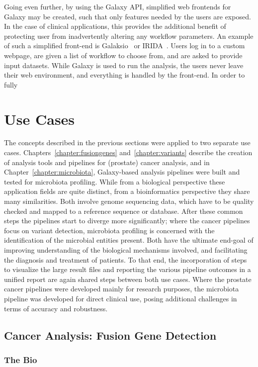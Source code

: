 Going even further, by using the Galaxy API, simplified web frontends for Galaxy may be created, such that only features needed by the users are exposed. In the case of clinical applications, this provides the additional benefit of protecting user from inadvertently altering any workflow parameters. An example of such a simplified front-end is Galaksio~\cite{galaksio} or IRIDA~\cite{matthews2018integrated}. Users log in to a custom webpage, are given a list of workflow to choose from, and are asked to provide input datasets. While Galaxy is used to run the analysis, the users never leave their web environment, and everything is handled by the front-end. In order to fully


\section{Use Cases}

The concepts described in the previous sections were applied to two separate use cases. Chapters~\ref{chapter:fusiongenes} and~\ref{chapter:variants} describe the creation of analysis tools and pipelines for (prostate) cancer analysis, and in Chapter~\ref{chapter:microbiota}, Galaxy-based analysis pipelines were built and tested for microbiota profiling. While from a biological perspective these application fields are quite distinct, from a bioinformatics perspective they share many similarities. Both involve genome sequencing data, which have to be quality checked and mapped to a reference sequence or database. After these common steps the pipelines start to diverge more significantly; where the cancer pipelines focus on variant detection, microbiota profiling is concerned with the identification of the microbial entities present. Both have the ultimate end-goal of improving understanding of the biological mechanisms involved, and facilitating the diagnosis and treatment of patients. To that end, the incorporation of steps to visualize the large result files and reporting the various pipeline outcomes in a unified report are again shared steps between both use cases. Where the prostate cancer pipelines were developed mainly for research purposes, the microbiota pipeline was developed for direct clinical use, posing additional challenges in terms of accuracy and robustness.


\subsection{Cancer Analysis: Fusion Gene Detection}
\subsubsection{The Bio}

